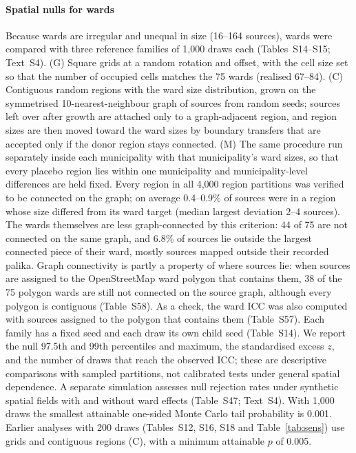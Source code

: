 \documentclass[preprint,12pt,authoryear]{elsarticle}
\begin{document}
\paragraph{Spatial nulls for wards} Because wards are irregular and unequal in size (16--164 sources), wards were compared with three reference families of 1,000 draws each (Tables~S14--S15; Text~S4). (G) Square grids at a random rotation and offset, with the cell size set so that the number of occupied cells matches the 75 wards (realised 67--84). (C) Contiguous random regions with the ward size distribution, grown on the symmetrised 10-nearest-neighbour graph of sources from random seeds; sources left over after growth are attached only to a graph-adjacent region, and region sizes are then moved toward the ward sizes by boundary transfers that are accepted only if the donor region stays connected. (M) The same procedure run separately inside each municipality with that municipality's ward sizes, so that every placebo region lies within one municipality and municipality-level differences are held fixed. Every region in all 4,000 region partitions was verified to be connected on the graph; on average 0.4--0.9\% of sources were in a region whose size differed from its ward target (median largest deviation 2--4 sources). The wards themselves are less graph-connected by this criterion: 44 of 75 are not connected on the same graph, and 6.8\% of sources lie outside the largest connected piece of their ward, mostly sources mapped outside their recorded palika. Graph connectivity is partly a property of where sources lie: when sources are assigned to the OpenStreetMap ward polygon that contains them, 38 of the 75 polygon wards are still not connected on the source graph, although every polygon is contiguous (Table~S58). As a check, the ward ICC was also computed with sources assigned to the polygon that contains them (Table~S57). Each family has a fixed seed and each draw its own child seed (Table~S14). We report the null 97.5th and 99th percentiles and maximum, the standardised excess $z$, and the number of draws that reach the observed ICC; these are descriptive comparisons with sampled partitions, not calibrated tests under general spatial dependence. A separate simulation assesses null rejection rates under synthetic spatial fields with and without ward effects (Table~S47; Text~S4). With 1,000 draws the smallest attainable one-sided Monte Carlo tail probability is 0.001. Earlier analyses with 200 draws (Tables~S12, S16, S18 and Table~\ref{tab:sens}) use grids and contiguous regions (C), with a minimum attainable $p$ of 0.005.
\end{document}

